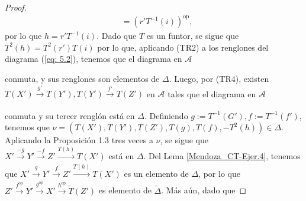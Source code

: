 \documentclass[tesis]{subfiles}
\begin{document}
\begin{proof}
\begin{align*}
                    &= (r'T^{-1}(i))^\text{op},
    \end{align*}
    por lo que $h = r'T^{-1}(i)$. Dado que $T$ es un funtor, se sigue que $T^2(h) = T^2(r')T(i)$ por lo que, aplicando (TR2) a los renglones del diagrama (\ref{eq: 5.2}), tenemos que el diagrama en $\mathscr{A}$
    \begin{center}
    \end{center}
    conmuta, y sus renglones son elementos de $\Delta$. Luego, por (TR4), existen $T(X')\xrightarrow[]{g'}T(Y'), T(Y')\xrightarrow[]{f'}T(Z')$ en $\mathscr{A}$ tales que el diagrama en $\mathscr{A}$
    \begin{center}
    \end{center}
    conmuta y su tercer renglón está en $\Delta$. Definiendo $g:= T^{-1}(G'), f:= T^{-1}(f')$, tenemos que $\nu = (T(X'),T(Y'),T(Z'),T(g),T(f),-T^2(h))\in\Delta$. Aplicando la Proposición 1.3 tres veces a $\nu$, se sigue que $X'\xrightarrow[]{-g} Y'\xrightarrow[]{-f} Z'\xrightarrow[]{T(h)} T(X')$ está en $\Delta$. Del Lema \ref{Mendoza_CT-Ejer.4}, tenemos que $X'\xrightarrow[]{g} Y'\xrightarrow[]{f} Z'\xrightarrow[]{T(h)} T(X')$ es un elemento de $\Delta$, por lo que $Z'\xrightarrow[]{f^\text{op}} Y'\xrightarrow[]{g^\text{op}} X'\xrightarrow[]{h^\text{op}} \tilde{T}(Z')$  es elemento de $\tilde{\Delta}$. Más aún, dado que

\end{proof}
\end{document}
